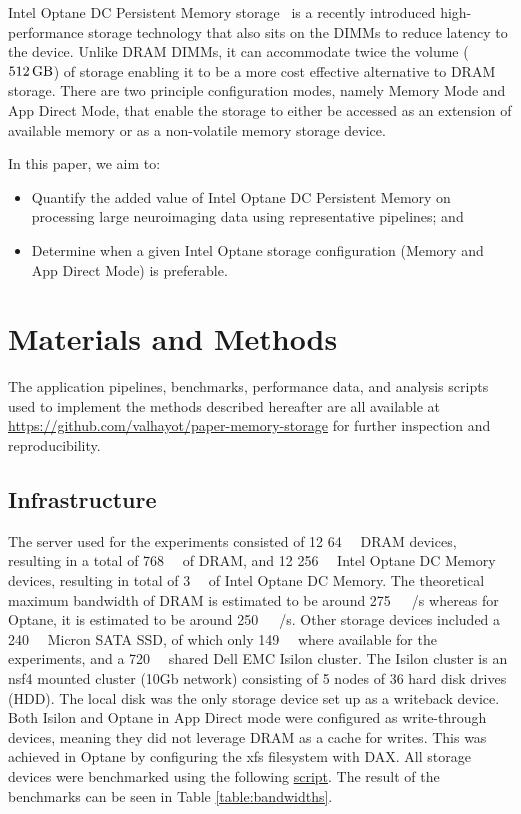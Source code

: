 \documentclass[conference]{IEEEtran}
\begin{document}
Intel Optane DC Persistent Memory storage~\cite{optanebrief} is a recently introduced high-performance
storage technology that also sits on the DIMMs to reduce latency to the device.
Unlike DRAM DIMMs, it can accommodate twice the volume ($\SI{512}{\giga\byte}$) of
storage enabling it to be a more cost effective alternative to DRAM storage.
There are two principle configuration modes, namely Memory Mode and App Direct Mode,
that enable the storage to either be accessed as an extension of available memory 
or as a non-volatile memory storage device.


In this paper, we aim to:
\begin{itemize}
        \item Quantify the added value of Intel Optane DC Persistent Memory on 
            processing large neuroimaging data using representative pipelines; and
        \item Determine when a given Intel Optane storage configuration (Memory 
            and App Direct Mode) is preferable.
\end{itemize}

\section{Materials and Methods}
The application pipelines, benchmarks, performance data, and analysis scripts used 
to implement the methods described hereafter are all available at 
\url{https://github.com/valhayot/paper-memory-storage} for 
further inspection and reproducibility.

\subsection{Infrastructure}

The server used for the experiments consisted of 12 \SI{64}{\gibi\byte} DRAM devices,
resulting in a total of \SI{768}{\gibi\byte} of DRAM, and 12 \SI{256}{\giga\byte} Intel Optane DC Memory
devices, resulting in total of \SI{3}{\tebi\byte} of Intel Optane DC Memory. The theoretical maximum bandwidth
of DRAM is estimated to be around \SI{275}{\gibi\byte}~/s whereas for Optane, it is
estimated to be around \SI{250}{\gibi\byte}~/s.
Other storage devices included a \SI{240}{\gibi\byte} Micron SATA SSD, of which
only \SI{149}{\gibi\byte} where available for the experiments, and a
\SI{720}{\tebi\byte} shared Dell EMC Isilon cluster. The Isilon cluster is an nsf4 mounted
cluster (10Gb network) consisting of 5 nodes of 36 hard disk drives (HDD). The local disk
was the only storage device set up as a writeback device. Both Isilon and Optane in
App Direct mode were configured as write-through devices, meaning they did not leverage
DRAM as a cache for writes. This was achieved in Optane by configuring the xfs filesystem with
DAX. All storage devices were benchmarked using the following \href{https://github.com/ValHayot/paper-memory-storage/scripts/bench_disks.sh}{script}.
The result of the benchmarks can be seen in Table \ref{table:bandwidths}.
\end{document}
